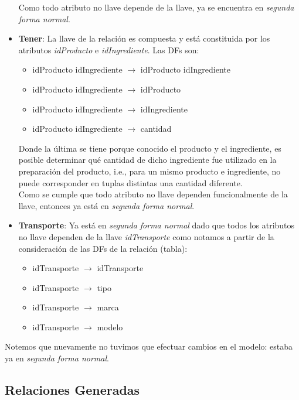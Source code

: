 \documentclass[11pt,letterpaper]{article}
\begin{document}
\begin{itemize}
Como todo atributo no llave depende de la llave, ya se encuentra en \textit{segunda forma normal}.
\item \textbf{Tener}: La llave de la relación es compuesta y está constituida por los atributos \textit{idProducto} e \textit{idIngrediente}. Las DFs son:

\begin{itemize}
\item idProducto idIngrediente $\rightarrow$ idProducto idIngrediente

\item idProducto idIngrediente $\rightarrow$ idProducto
\item idProducto idIngrediente $\rightarrow$ idIngrediente

\item idProducto idIngrediente $\rightarrow$ cantidad

\end{itemize}

Donde la última se tiene porque conocido el producto y el ingrediente, es posible determinar qué cantidad de dicho ingrediente fue utilizado en la preparación del producto, i.e., para un mismo producto e ingrediente, no puede corresponder en tuplas distintas una cantidad diferente. \\

Como se cumple que todo atributo no llave dependen funcionalmente de la llave, entonces ya está en \textit{segunda forma normal}.
\item \textbf{Transporte}: Ya está en \textit{segunda forma normal} dado que todos los atributos no llave dependen de la llave \textit{idTransporte} como notamos a partir de la consideración de las DFs de la relación (tabla):

\begin{itemize}
\item idTransporte $\rightarrow$ idTransporte

\item idTransporte $\rightarrow$ tipo
\item idTransporte $\rightarrow$ marca
\item idTransporte $\rightarrow$ modelo
\end{itemize}
\end{itemize}

Notemos que nuevamente no tuvimos que efectuar cambios en el modelo: estaba ya en \textit{segunda forma normal}.

\subsection{Relaciones Generadas}
\end{document}
